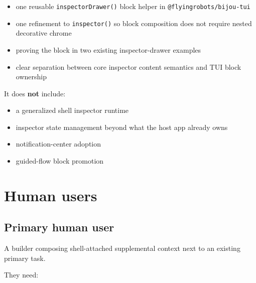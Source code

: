 \begin{itemize}
\tightlist
\item
  one reusable \texttt{i\allowbreak{}n\allowbreak{}s\allowbreak{}p\allowbreak{}e\allowbreak{}c\allowbreak{}t\allowbreak{}o\allowbreak{}r\allowbreak{}D\allowbreak{}r\allowbreak{}a\allowbreak{}w\allowbreak{}e\allowbreak{}r\allowbreak{}(\allowbreak{})} block helper in \texttt{@\allowbreak{}f\allowbreak{}l\allowbreak{}y\allowbreak{}i\allowbreak{}n\allowbreak{}g\allowbreak{}r\allowbreak{}o\allowbreak{}b\allowbreak{}o\allowbreak{}t\allowbreak{}s\allowbreak{}/\allowbreak{}b\allowbreak{}i\allowbreak{}j\allowbreak{}o\allowbreak{}u\allowbreak{}-\allowbreak{}t\allowbreak{}u\allowbreak{}i}
\item
  one refinement to \texttt{i\allowbreak{}n\allowbreak{}s\allowbreak{}p\allowbreak{}e\allowbreak{}c\allowbreak{}t\allowbreak{}o\allowbreak{}r\allowbreak{}(\allowbreak{})} so block composition does not require nested decorative chrome
\item
  proving the block in two existing inspector-drawer examples
\item
  clear separation between core inspector content semantics and TUI block ownership
\end{itemize}

It does \textbf{not} include:

\begin{itemize}
\tightlist
\item
  a generalized shell inspector runtime
\item
  inspector state management beyond what the host app already owns
\item
  notification-center adoption
\item
  guided-flow block promotion
\end{itemize}

\section{Human users}\label{record-174-human-users}

\subsection{Primary human user}\label{record-174-primary-human-user}

A builder composing shell-attached supplemental context next to an existing primary task.

They need:


